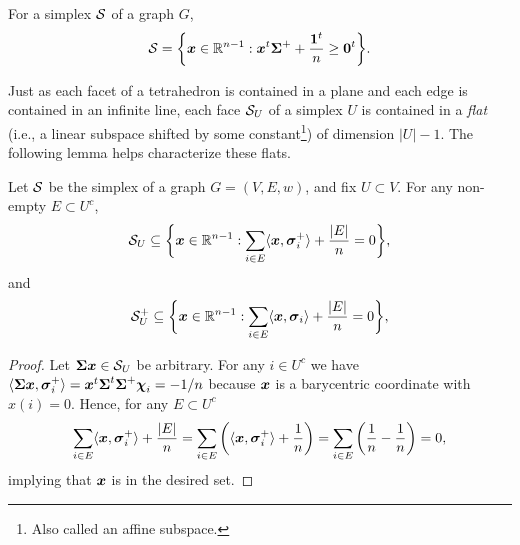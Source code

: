 \begin{lemma}
\label{lem:S_alt_desc}
For a simplex $\mathcal{S}$ of a graph $G$, 
\begin{equation}
\label{eq:S_alt_desc}
    \mathcal{S}=\bigg\{\vb*{x}\in \mathbb{R}^{n-1}:\vb*{x}^t\boldsymbol{\Sigma}^++\frac{\vb{1}^t}{n}\geq \vb{0}^t\bigg\}.
\end{equation}
\end{lemma}

Just as each facet of a tetrahedron is contained in a plane and each edge is contained in an infinite line, each face $\mathcal{S}_U$ of a simplex $U$ is contained in a \emph{flat} (i.e., a linear subspace shifted by some constant\footnote{Also  called an affine subspace.}) of dimension $|U|-1$. The following lemma helps characterize these flats. 

\begin{lemma}
\label{lem:SUsubset}
Let $\mathcal{S}$ be the simplex of a graph $G=(V,E,w)$, and fix $U\subset V$. For any non-empty $E\subset U^c$,
\begin{equation*}
    \mathcal{S}_U \subseteq \bigg\{\vb*{x}\in\mathbb{R}^{n-1}: \sum_{i\in E}\langle \vb*{x},\vb*{\sigma}_i^+\rangle +\frac{|E|}{n}=  0\bigg\},
\end{equation*}
and
\begin{equation*}
    \mathcal{S}^+_U \subseteq \bigg\{\vb*{x}\in\mathbb{R}^{n-1}: \sum_{i\in E}\langle \vb*{x},\vb*{\sigma}_i\rangle +\frac{|E|}{n}=  0\bigg\},
\end{equation*}
\end{lemma}
\begin{proof}
Let $\boldsymbol{\Sigma}\vb*{x}\in\mathcal{S}_U$ be arbitrary. For any $i\in U^c$ we have $\langle \boldsymbol{\Sigma}\vb*{x},\vb*{\sigma}_i^+\rangle = \vb*{x}^t\boldsymbol{\Sigma}^t\boldsymbol{\Sigma}^+\boldsymbol{\chi}_i=-1/n$ because $\vb*{x}$ is a barycentric coordinate with  $x(i)=0$. Hence, for any $E\subset U^c$
\[\sum_{i\in E}\langle \vb*{x},\vb*{\sigma}_i^+\rangle + \frac{|E|}{n} = \sum_{i\in E}\bigg(\langle \vb*{x},\vb*{\sigma}_i^+\rangle+\frac{1}{n}\bigg)=\sum_{i\in E}\bigg(\frac{1}{n}-\frac{1}{n}\bigg)=0,\]
implying that $\vb*{x}$ is in the desired set. 
\end{proof}

